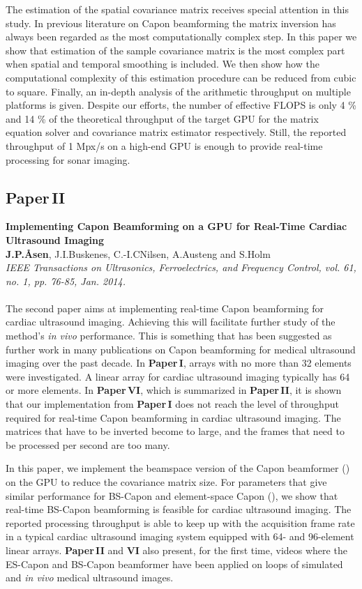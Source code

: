 The estimation of the spatial covariance matrix receives special attention in this study. In previous literature on Capon beamforming the matrix inversion has always been regarded as the most computationally complex step. In this paper we show that estimation of the sample covariance matrix is the most complex part when spatial and temporal smoothing is included. We then show how the computational complexity of this estimation procedure can be reduced from cubic to square. Finally, an in-depth analysis of the arithmetic throughput on multiple platforms is given. Despite our efforts, the number of effective FLOPS is only 4 \% and 14 \% of the theoretical throughput of the target GPU for the matrix equation solver and covariance matrix estimator respectively. Still, the reported throughput of 1 Mpx/s on a high-end GPU is enough to provide real-time processing for sonar imaging.

\subsection{Paper\,II}
\textbf{Implementing Capon Beamforming on a GPU for Real-Time Cardiac Ultrasound Imaging}\\
\textbf{J.\:P.\:\AA{}sen}, J.\:I.\:Buskenes, C.-I.\:C\:Nilsen, A.\:Austeng and S.\:Holm\\
{\it IEEE Transactions on Ultrasonics, Ferroelectrics, and Frequency Control, vol. 61, no. 1, pp. 76-85, Jan. 2014.}\\\\
The second paper aims at implementing real-time Capon beamforming for cardiac ultrasound imaging. Achieving this will facilitate further study of the method's \textit{in vivo} performance. This is something that has been suggested as further work in many publications on Capon beamforming for medical ultrasound imaging over the past decade. In \textbf{Paper\,I}, arrays with no more than 32 elements were investigated. A linear array for cardiac ultrasound imaging typically has 64 or more elements. In \textbf{Paper\,VI}, which is summarized in \textbf{Paper\,II}, it is shown that our implementation from  \textbf{Paper\,I} does not reach the level of throughput required for real-time Capon beamforming in cardiac ultrasound imaging. The matrices that have to be inverted become to large, and the frames that need to be processed per second are too many.

In this paper, we implement the beamspace version of the Capon beamformer () on the GPU  to reduce the covariance matrix size. For parameters that give similar performance for BS-Capon and element-space Capon (), we show that real-time BS-Capon beamforming is feasible for cardiac ultrasound imaging. The reported processing throughput is able to keep up with the acquisition frame rate in a typical cardiac ultrasound imaging system equipped with 64- and 96-element linear arrays.  \textbf{Paper\,II} and \textbf{VI} also present, for the first time, videos where the ES-Capon and BS-Capon beamformer have been applied on loops of simulated and \textit{in vivo} medical ultrasound images.

